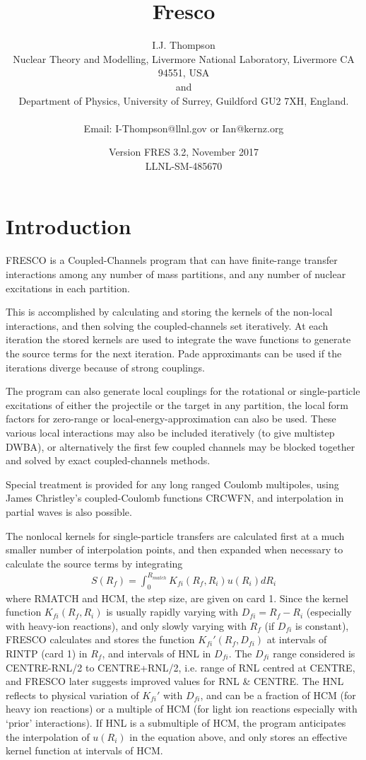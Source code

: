 \documentclass[11pt]{article}
\title{\Huge Fresco}
\date{Version FRES 3.2, November 2017\\  LLNL-SM-485670}
\author{I.J. Thompson\\
%
Nuclear Theory and Modelling, Livermore National Laboratory, Livermore CA 94551, USA\\
and 
\\Department of Physics, University of Surrey, Guildford GU2 7XH, England.
\\ %
\\Email:  I-Thompson@llnl.gov  or Ian@kernz.org}
\newcommand{\beqn}{\begin{eqnarray*}}
\newcommand{\eeqn}{\end{eqnarray*}}
\begin{document}
\maketitle
\section{Introduction}

{\large
\parskip 5pt
\parindent 10pt

FRESCO is a Coupled-Channels program that can have finite-range
transfer interactions among any number of mass partitions, and any
number of nuclear excitations in each partition.

This is accomplished by calculating and storing the kernels of the
non-local interactions, and then solving the coupled-channels set
iteratively.
At each iteration the stored kernels are used to integrate the wave
functions to generate the source terms for the next iteration.
Pade approximants can be used if the iterations diverge because of
strong couplings.

The program can also generate local couplings for the rotational
or single-particle excitations of either the projectile or the
target in any partition,
the local form factors for zero-range or local-energy-approximation
can also be used.
These various local interactions may also be included iteratively
(to give multistep DWBA), or alternatively the first few coupled
channels may be blocked together and solved by exact coupled-channels
methods.

Special treatment is provided for any long ranged Coulomb multipoles,
using James Christley's coupled-Coulomb functions CRCWFN,
and interpolation in partial waves is also possible.

The nonlocal kernels for single-particle transfers are calculated first
at a much smaller number of interpolation points,
and then expanded when necessary to calculate the source terms by
integrating
\beqn
S(R _ f ) = \int _ 0 ^ {R _ {match}}
                K _ {fi} (R _ f , R _ i ) u(R _ i ) dR _ i
\eeqn
where RMATCH and HCM, the step size, are given on card 1.
Since the kernel function $K_{fi}(R_f,R_i)$ is usually rapidly varying with
$D_{fi} = R_{f} - R_{i}$ (especially with heavy-ion reactions), and only slowly
varying with $R_{f}$ (if $D_{fi}$ is constant),  FRESCO calculates and stores
the function $K_{fi}'(R_{f},D_{fi})$ at intervals of RINTP (card 1) in $R_{f}$,
and intervals of HNL in $D_{fi}$. The $D_{fi}$ range considered is
CENTRE-RNL/2 to CENTRE+RNL/2, i.e. range of RNL centred at CENTRE,
and FRESCO later suggests improved values for RNL \& CENTRE.
The HNL reflects to physical variation of $K_{fi}'$ with $D_{fi}$, and can be
a fraction of HCM (for heavy ion reactions) or a multiple of HCM
(for light ion reactions especially with `prior' interactions).
If HNL is a submultiple of HCM, the program anticipates the interpolation
of $u(R_{i})$ in the equation above, and only stores an effective kernel
function at intervals of HCM.

}
\end{document}
